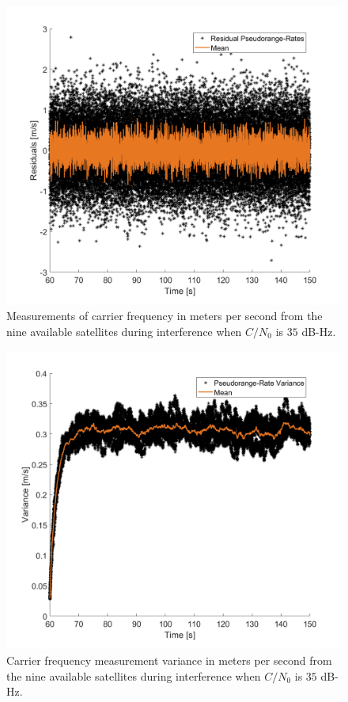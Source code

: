 \documentclass[12pt]{report}
\begin{document}
\begin{figure}[!ht]
  \centering
  \includegraphics[width=0.75\linewidth]{Figures/Results/Scenario1/Case35/carrierFreq.png}
  \caption{Measurements of carrier frequency in meters per second from the nine available satellites during interference when \(C/N_0\) is \(35\) dB-Hz.}\label{fig:carrier35}
\end{figure}

\begin{figure}[!ht]
  \centering
  \includegraphics[width=0.75\linewidth]{Figures/Results/Scenario1/Case35/carrierVariance.png}
  \caption{Carrier frequency measurement variance in meters per second from the nine available satellites during interference when \(C/N_0\) is \(35\) dB-Hz.}\label{fig:carrierVariance35}
\end{figure}
\end{document}
